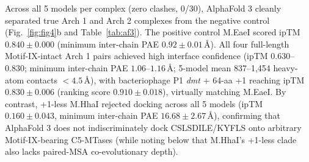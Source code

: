 \documentclass[10pt,letterpaper]{article}
\newcommand{\gene}[1]{\textit{#1}}
\begin{document}
Across all 5 models per complex (zero clashes, 0/30), AlphaFold 3 cleanly separated true Arch 1 and Arch 2 complexes from the negative control (Fig.~\ref{fig:fig4}b and Table~\ref{tab:af3}). The positive control M.EaeI scored ipTM $0.840 \pm 0.000$ (minimum inter-chain PAE $0.92 \pm 0.01$\,\AA). All four full-length Motif-IX-intact Arch 1 pairs achieved high interface confidence (ipTM $0.630$--$0.830$; minimum inter-chain PAE $1.06$--$1.16$\,\AA; 5-model mean 837--1,454 heavy-atom contacts $< 4.5$\,\AA), with bacteriophage P1 \gene{dmt} + 64-aa +1 reaching ipTM $0.830 \pm 0.006$ (ranking score $0.910 \pm 0.018$), virtually matching M.EaeI. By contrast, +1-less M.HhaI rejected docking across all 5 models (ipTM $0.160 \pm 0.043$, minimum inter-chain PAE $16.68 \pm 2.67$\,\AA), confirming that AlphaFold 3 does not indiscriminately dock CSLSDILE/KYFLS onto arbitrary Motif-IX-bearing C5-MTases (while noting below that M.HhaI's +1-less clade also lacks paired-MSA co-evolutionary depth).
\end{document}

